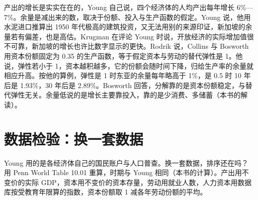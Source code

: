 \begin{pitfall}
产出的增长是实实在在的，Young 自己说，四个经济体的人均产出每年增长 6\%—7\%\cite{young1994}。余量是减出来的数，取决于份额、投入与生产函数的假定。Young 说，他用水泥进口推算出 1950 年代极高的建筑投资，又无法用别的来源印证，新加坡的余量若有偏差，也是高估\cite{young1994}。Krugman 在评论 Young 时说，开放经济的实际增加值很不可靠，新加坡的增长也许比数字显示的更快\cite{young1992}。Rodrik 说，Collins 与 Bosworth 用资本份额固定为 0.35 的生产函数，等于假定资本与劳动的替代弹性是 1\cite{collinsbosworth1996}。他说，弹性若小于 1，资本越积越多，它的份额会随时间下降，归给生产率的余量就相应升高\cite{collinsbosworth1996}。按他的算例，弹性是 1 时东亚的余量每年略高于 1\%，是 0.5 时 10 年后是 1.93\%，30 年后是 2.89\%\cite{collinsbosworth1996}。Bosworth 回答，分解靠的是资本份额稳定，与替代弹性无关\cite{collinsbosworth1996}。余量低说的是增长主要靠投入，靠的是少消费、多储蓄（本书的解读）。
\end{pitfall}

\section{数据检验：换一套数据}\label{sec:eastasia-check}

Young 用的是各经济体自己的国民账户与人口普查。换一套数据，排序还在吗？用 Penn World Table 10.01 重算，时期与 Young 相同（本书的计算）\cite{pwt1001,young1994}。产出用不变价的实际 GDP，资本用不变价的资本存量，劳动用就业人数，人力资本用数据库按受教育年限算的指数，资本份额取 1 减各年劳动份额的平均\cite{pwt1001}。

